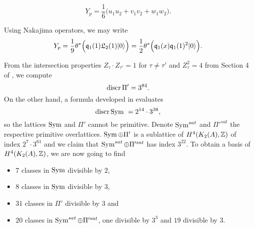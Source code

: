 \begin{corollary}\label{Classuvw}
\begin{equation} \label{YSym}
Y_p =  \frac{1}{6}\Big(u_1u_2 + v_1v_2 +  w_1 w_2 \Big).
\end{equation}
\end{corollary}
\begin{remark}
Using Nakajima operators, we may write
\begin{gather}
Y_p = \frac{1}{9} \theta^*\Big( \mathfrak{q}_1(1)\mathfrak L_2(1) |0\rangle \Big) =  \frac{1}{2}\theta^*\Big(\mathfrak{q}_1(x)\mathfrak{q}_1(1)^2|0\rangle\Big).
\end{gather}

\end{remark}

From the intersection properties $Z_\tau \cdot Z_{\tau'} = 1$ for $\tau\neq \tau'$ and $Z_\tau^2 = 4$ from Section 4 of \cite{Hassett}, we compute
\begin{equation}
 \operatorname{discr} \Pi' = 3^{84}.
 \label{discrPi}
\end{equation}
On the other hand, a formula developed in \cite{Kapfer} evaluates
\begin{equation} \label{DiscrSym}
\operatorname{discr} \operatorname{Sym} \ = 2^{14}\cdot 3^{38},
\end{equation}
so the lattices $\operatorname{Sym}$ and $\Pi'$ cannot be primitive. Denote $\operatorname{Sym}^{sat}$ and $\Pi'^{sat}$ the respective primitive overlattices. $\operatorname{Sym} \oplus\Pi'$ is a sublattice of $H^4(K_{ 2 }( A ),\mathbb{Z})$ of index $2^{7}\cdot 3^{61}$ and we claim that $\operatorname{Sym}^{sat}\oplus \Pi'^{sat}$ has index $3^{22}$. To obtain a basis of $H^4(K_{ 2 }( A ),\mathbb{Z})$, we are now going to find
\begin{itemize}
 \item $7$ classes in $\operatorname{Sym}$ divisible by $2$,
 \item $8$ classes in $\operatorname{Sym}$ divisible by $3$,
 \item $31$ classes in $\Pi'$ divisible by $3$ and
 \item $20$ classes in $\operatorname{Sym}^{sat}\oplus \Pi'^{sat}$, one divisible by $3^3$ and $19$ divisible by $3$.
\end{itemize}

